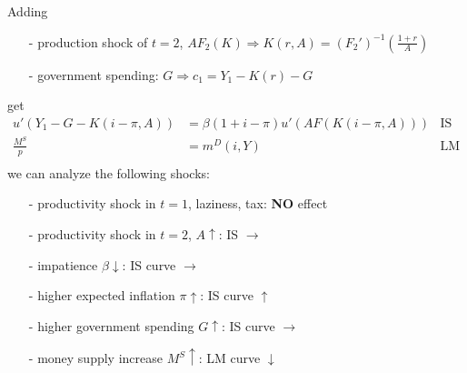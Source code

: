 \documentclass[10pt,a4paper]{article}
\begin{document}
\begin{multicols*}{3}
Adding
\begin{itemize}
    \item[-] production shock of $t=2$, $AF_2(K)\Rightarrow K(r,A)=(F_2')^{-1}\left(\frac{1+r}{A}\right)$
    \item[-] government spending: $G\Rightarrow c_1=Y_1-K(r)-G$
\end{itemize}
get 
\begin{align*}
    u'(Y_1-G-K(i-\pi,A)) &= \beta(1+i-\pi)u'(AF(K(i-\pi,A))) & \text{IS}\\
    \frac{M^S}{p} &= m^D(i,Y) & \text{LM}\\
\end{align*}
we can analyze the following shocks:
\begin{itemize}
    \item[-] productivity shock in $t=1$, laziness, tax: \textbf{NO} effect
    \item[-] productivity shock in $t=2$, $A\uparrow$: IS $\rightarrow$
    \item[-] impatience $\beta \downarrow$: IS curve $\rightarrow$
    \item[-] higher expected inflation $\pi \uparrow$: IS curve $\uparrow$
    \item[-] higher government spending $G\uparrow$: IS curve $\rightarrow$
    \item[-] money supply increase $M^S \uparrow$: LM curve $\downarrow$
\end{itemize}


\end{multicols*}
\end{document}
